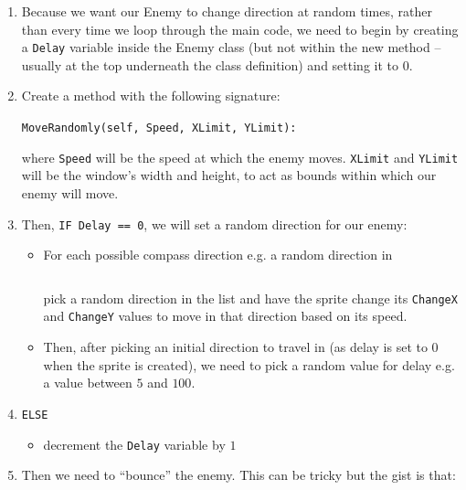 \documentclass[12pt]{article}
\begin{document}
\begin{Exercise}[title=PyGame: Making an `enemy' class.]
{		\begin{enumerate}
	    \item Because we want our Enemy to change direction at random times, rather than every time we loop through the main code, we need to begin by creating a {\tt Delay} variable inside the Enemy class (but not within the new method -- usually at the top underneath the class definition) and setting it to $0$.

		\item Create a method with the following signature:
			
			\vspace{0.5em}
			{\tt MoveRandomly(self, Speed, XLimit, YLimit):}
			\vspace{0.5em}
			
			where {\tt Speed} will be the speed at which the enemy moves. {\tt XLimit} and {\tt YLimit} will be the window's width and height, to act as bounds within which our enemy will move.

		\item Then, {\tt IF Delay == 0}, we will set a random direction for our enemy:

			\begin{itemize}
				\item For each possible compass direction e.g. a random direction in
				
				\begin{equation*}
				    [\mathbf{``N", ``NE", ``E", ``SE", ``S", ``SW", ``W", ``NW"}]
				\end{equation*}
				
				pick a random direction in the list and have the sprite change its {\tt ChangeX} and {\tt ChangeY} values to move in that direction based on its speed.

				\item Then, after picking an initial direction to travel in (as delay is set to $0$ when the sprite is created), we need to pick a random value for delay e.g. a value between $5$ and $100$.
			\end{itemize}

		\item {\tt ELSE}

			\begin{itemize}
				\item decrement the {\tt Delay} variable by $1$
			\end{itemize}
			
    	\item Then we need to ``bounce'' the enemy. This can be tricky but the gist is that:


\end{enumerate}}
\end{Exercise}
\end{document}
